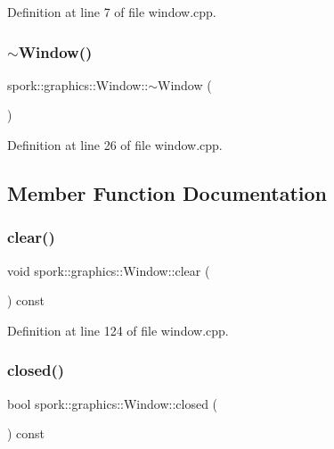 Definition at line 7 of file window.\+cpp.

\mbox{\label{classspork_1_1graphics_1_1_window_af802335c30188ec6f226954200c45cde}} 
\subsubsection{\texorpdfstring{$\sim$\+Window()}{~Window()}}
{\footnotesize\ttfamily spork\+::graphics\+::\+Window\+::$\sim$\+Window (\begin{DoxyParamCaption}{ }\end{DoxyParamCaption})}



Definition at line 26 of file window.\+cpp.



\subsection{Member Function Documentation}
\mbox{\label{classspork_1_1graphics_1_1_window_a5db0b0195bc1871329992ac07a3cfd60}} 
\subsubsection{\texorpdfstring{clear()}{clear()}}
{\footnotesize\ttfamily void spork\+::graphics\+::\+Window\+::clear (\begin{DoxyParamCaption}{ }\end{DoxyParamCaption}) const}



Definition at line 124 of file window.\+cpp.

\mbox{\label{classspork_1_1graphics_1_1_window_a159afdd9ce89591b3dd14c05fede4047}} 
\subsubsection{\texorpdfstring{closed()}{closed()}}
{\footnotesize\ttfamily bool spork\+::graphics\+::\+Window\+::closed (\begin{DoxyParamCaption}{ }\end{DoxyParamCaption}) const}



